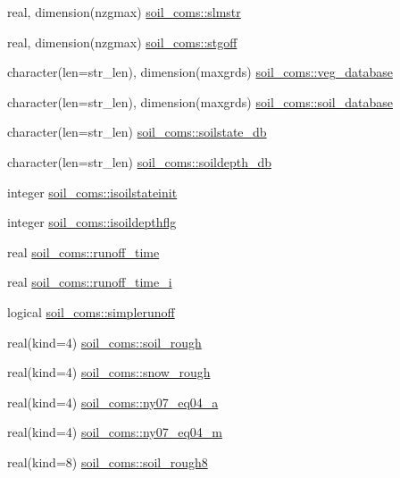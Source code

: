 \begin{DoxyCompactItemize}
real, dimension(nzgmax) \hyperlink{namespacesoil__coms_a6a020a30c4f8a882edc28462a83e55ba}{soil\+\_\+coms\+::slmstr}
\item 
real, dimension(nzgmax) \hyperlink{namespacesoil__coms_abe490ee71d5f063358005df47f9dee38}{soil\+\_\+coms\+::stgoff}
\item 
character(len=str\+\_\+len), dimension(maxgrds) \hyperlink{namespacesoil__coms_a635e352f4923b8060b939ac82c23dbef}{soil\+\_\+coms\+::veg\+\_\+database}
\item 
character(len=str\+\_\+len), dimension(maxgrds) \hyperlink{namespacesoil__coms_a194bdfd0c85724271f3424bb0674755f}{soil\+\_\+coms\+::soil\+\_\+database}
\item 
character(len=str\+\_\+len) \hyperlink{namespacesoil__coms_a7a54852974f4d42c4e4bfbd1145a3e44}{soil\+\_\+coms\+::soilstate\+\_\+db}
\item 
character(len=str\+\_\+len) \hyperlink{namespacesoil__coms_a5d607eec910da5341af027871e06a16e}{soil\+\_\+coms\+::soildepth\+\_\+db}
\item 
integer \hyperlink{namespacesoil__coms_a947d75e4045f6ba45a69e5334f834222}{soil\+\_\+coms\+::isoilstateinit}
\item 
integer \hyperlink{namespacesoil__coms_a8495256902c21d8ea298192d9e9a9f60}{soil\+\_\+coms\+::isoildepthflg}
\item 
real \hyperlink{namespacesoil__coms_a4560c15d785323d98ca7f84a60e07fd2}{soil\+\_\+coms\+::runoff\+\_\+time}
\item 
real \hyperlink{namespacesoil__coms_abbda4cf2bb85860666afd7f70310f519}{soil\+\_\+coms\+::runoff\+\_\+time\+\_\+i}
\item 
logical \hyperlink{namespacesoil__coms_ae8cfc7c2c5c0a303067e834b6ba03694}{soil\+\_\+coms\+::simplerunoff}
\item 
real(kind=4) \hyperlink{namespacesoil__coms_a2bcc1e9ab626c4a0ac76283c272805c6}{soil\+\_\+coms\+::soil\+\_\+rough}
\item 
real(kind=4) \hyperlink{namespacesoil__coms_a42917920add793523d269a722a3cfa3b}{soil\+\_\+coms\+::snow\+\_\+rough}
\item 
real(kind=4) \hyperlink{namespacesoil__coms_aabd4871bca5e3dfef69f79324610f998}{soil\+\_\+coms\+::ny07\+\_\+eq04\+\_\+a}
\item 
real(kind=4) \hyperlink{namespacesoil__coms_a881853a16ef7d613c94c38cc5f56f4c0}{soil\+\_\+coms\+::ny07\+\_\+eq04\+\_\+m}
\item 
real(kind=8) \hyperlink{namespacesoil__coms_a33d9bb430514fde199b526e39479b7a4}{soil\+\_\+coms\+::soil\+\_\+rough8}

\end{DoxyCompactItemize}
